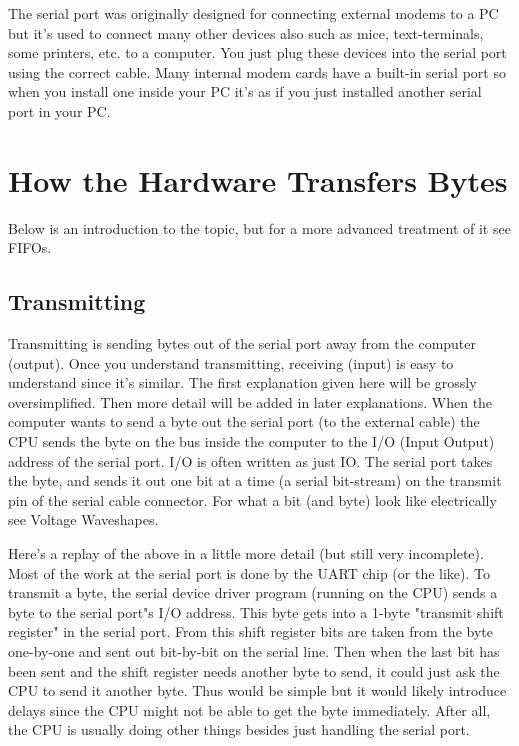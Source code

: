 \documentclass[11pt, twosides, titlepage]{article}
\begin{document}
    The serial port was originally designed for connecting external modems to a PC but it's used to connect many other devices also such as mice, text-terminals, some printers, etc. to a computer. You just plug these devices into the serial port using the correct cable. Many internal modem cards have a built-in serial port so when you install one inside your PC it's as if you just installed another serial port in your PC.
    
\section{How the Hardware Transfers Bytes}

    Below is an introduction to the topic, but for a more advanced treatment of it see FIFOs.

    \subsection{Transmitting}

        Transmitting is sending bytes out of the serial port away from the computer (output). Once you understand transmitting, receiving (input) is easy to understand since it's similar. The first explanation given here will be grossly oversimplified. Then more detail will be added in later explanations. When the computer wants to send a byte out the serial port (to the external cable) the CPU sends the byte on the bus inside the computer to the I/O (Input Output) address of the serial port. I/O is often written as just IO. The serial port takes the byte, and sends it out one bit at a time (a serial bit-stream) on the transmit pin of the serial cable connector. For what a bit (and byte) look like electrically see Voltage Waveshapes.

        Here's a replay of the above in a little more detail (but still very incomplete). Most of the work at the serial port is done by the UART chip (or the like). To transmit a byte, the serial device driver program (running on the CPU) sends a byte to the serial port"s I/O address. This byte gets into a 1-byte "transmit shift register" in the serial port. From this shift register bits are taken from the byte one-by-one and sent out bit-by-bit on the serial line. Then when the last bit has been sent and the shift register needs another byte to send, it could just ask the CPU to send it another byte. Thus would be simple but it would likely introduce delays since the CPU might not be able to get the byte immediately. After all, the CPU is usually doing other things besides just handling the serial port.
        
\end{document}
